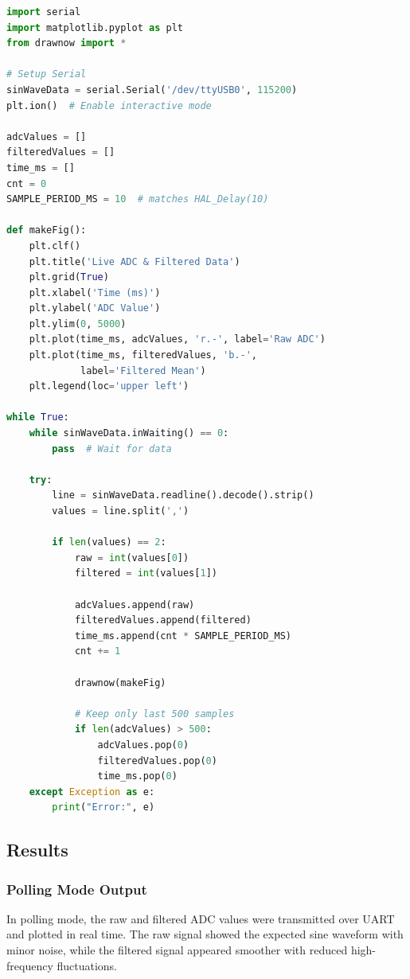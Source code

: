 \documentclass[12pt,a4paper]{article}
\begin{document}
\begin{lstlisting}[language=Python,caption=Python Plotting Script (plot\_adc.py)]
import serial
import matplotlib.pyplot as plt
from drawnow import *

# Setup Serial
sinWaveData = serial.Serial('/dev/ttyUSB0', 115200)
plt.ion()  # Enable interactive mode

adcValues = []
filteredValues = []
time_ms = []
cnt = 0
SAMPLE_PERIOD_MS = 10  # matches HAL_Delay(10)

def makeFig():
    plt.clf()
    plt.title('Live ADC & Filtered Data')
    plt.grid(True)
    plt.xlabel('Time (ms)')
    plt.ylabel('ADC Value')
    plt.ylim(0, 5000)
    plt.plot(time_ms, adcValues, 'r.-', label='Raw ADC')
    plt.plot(time_ms, filteredValues, 'b.-',
             label='Filtered Mean')
    plt.legend(loc='upper left')

while True:
    while sinWaveData.inWaiting() == 0:
        pass  # Wait for data

    try:
        line = sinWaveData.readline().decode().strip()
        values = line.split(',')

        if len(values) == 2:
            raw = int(values[0])
            filtered = int(values[1])

            adcValues.append(raw)
            filteredValues.append(filtered)
            time_ms.append(cnt * SAMPLE_PERIOD_MS)
            cnt += 1

            drawnow(makeFig)

            # Keep only last 500 samples
            if len(adcValues) > 500:
                adcValues.pop(0)
                filteredValues.pop(0)
                time_ms.pop(0)
    except Exception as e:
        print("Error:", e)
\end{lstlisting}

\subsection{Results}

\subsubsection{Polling Mode Output}
In polling mode, the raw and filtered ADC values were transmitted over UART and plotted in real time. The raw signal showed the expected sine waveform with minor noise, while the filtered signal appeared smoother with reduced high-frequency fluctuations.
\end{document}
